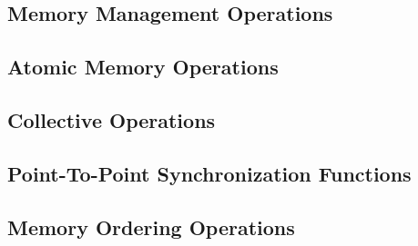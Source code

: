 \documentclass[10pt]{book}
\begin{document}
{\subsection{Memory Management Operations}

\label{subsec:shfree}

\label{subsec:shmem_put}
\label{subsec:shmem_p}
\label{subsec:shmem_get}
\label{subsec:shmem_g}
\subsection{Atomic Memory Operations}

\label{subsec:shmem_add}
\label{subsec:shmem_cswap}
\label{subsec:shmem_swap}
\label{subsec:shmem_finc}
\label{subsec:shmem_inc}
\label{subsec:shmem_fadd}
\subsection{Collective Operations}
\label{subsec:coll}

\label{subsec:shmem_barrier_all}
\label{subsec:shmem_barrier}
\label{subsec:shmem_broadcast}
\label{subsec:shmem_collect} %
\label{subsec:shmem_reductions}
\subsection{Point-To-Point Synchronization Functions}%
\label{subsec:shmem_wait}
\subsection{Memory Ordering Operations} %
\label{subsec:memory_order}
\label{subsec:shmem_fence}
\label{subsec:shmem_quiet}


}
\end{document}
